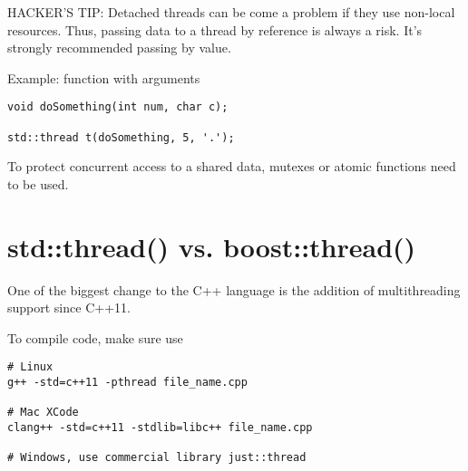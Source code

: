 \begin{mdframed}
HACKER'S TIP: Detached threads can be come a problem if they use non-local
resources. Thus, passing data to a thread by reference is always a risk. It's
strongly recommended passing by value.
\end{mdframed}

Example: function with arguments
\begin{lstlisting}
void doSomething(int num, char c);

std::thread t(doSomething, 5, '.');
\end{lstlisting}



To protect concurrent access to a shared data, mutexes or atomic functions need
to be used.

\section{std::thread() vs. boost::thread()}


One of the biggest change to the C++ language is the addition of multithreading
support since C++11.

To compile code, make sure use 
\begin{verbatim}
# Linux
g++ -std=c++11 -pthread file_name.cpp

# Mac XCode
clang++ -std=c++11 -stdlib=libc++ file_name.cpp

# Windows, use commercial library just::thread
\end{verbatim}




